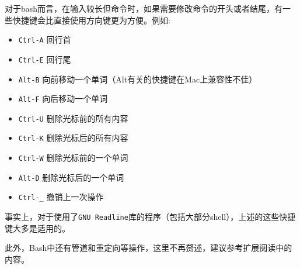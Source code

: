 对于bash而言，在输入较长但命令时，如果需要修改命令的开头或者结尾，有一些快捷键会比直接使用方向键更为方便。例如:
\begin{itemize}
  \item \texttt{Ctrl-A} 回行首
  \item \texttt{Ctrl-E} 回行尾
  \item \texttt{Alt-B} 向前移动一个单词（Alt有关的快捷键在Mac上兼容性不佳）
  \item \texttt{Alt-F} 向后移动一个单词
  \item \texttt{Ctrl-U} 删除光标前的所有内容
  \item \texttt{Ctrl-K} 删除光标后的所有内容
  \item \texttt{Ctrl-W} 删除光标前的一个单词
  \item \texttt{Alt-D} 删除光标后的一个单词
  \item \texttt{Ctrl-\_} 撤销上一次操作
\end{itemize}
事实上，对于使用了\texttt{GNU Readline}库的程序（包括大部分shell），上述的这些快捷键大多是适用的。

此外，Bash中还有管道和重定向等操作，这里不再赘述，建议参考扩展阅读中的内容。

